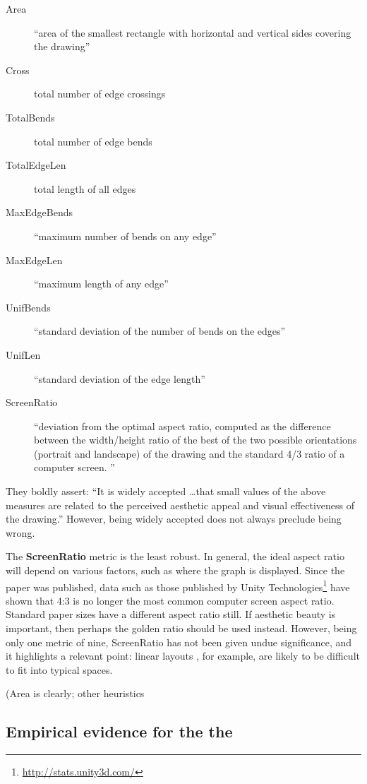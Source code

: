 \begin{description}
    \item[Area]
``area of the smallest rectangle with horizontal and vertical sides covering the drawing''
    \item[Cross]
total number of edge crossings
    \item[TotalBends]
total number of edge bends
    \item[TotalEdgeLen]
total length of all edges
    \item[MaxEdgeBends]
``maximum number of bends on any edge''
    \item[MaxEdgeLen]
``maximum length of any edge''
    \item[UnifBends]
``standard deviation of the number of bends on the edges''
    \item[UnifLen]
``standard deviation of the edge length''
    \item[ScreenRatio]
``deviation from the optimal aspect ratio, computed as the difference between the width/height ratio of the best of the two possible orientations (portrait and landscape) of the drawing and the standard 4/3 ratio of a computer screen. ''
\end{description}

They boldly assert: ``It is widely accepted \ldots that small values of the above measures are related to the perceived aesthetic appeal and visual effectiveness of the drawing.''
However, being widely accepted does not always preclude being wrong.

The \textbf{ScreenRatio} metric is the least robust.
In general, the ideal aspect ratio will depend on various factors, such as where the graph is displayed.
Since the paper was published, data such as those published by Unity Technologies\footnote{\url{http://stats.unity3d.com/}} have shown that 4:3 is no longer the most common computer screen aspect ratio.
Standard paper sizes have a different aspect ratio still.
If aesthetic beauty is important, then perhaps the golden ratio  should be used instead.
However, being only one metric of nine, ScreenRatio has not been given undue significance, and it highlights a relevant point: linear layouts , for example, are likely to be difficult to fit into typical spaces.

(Area is clearly; other heuristics 


\subsection{Empirical evidence for the the }

